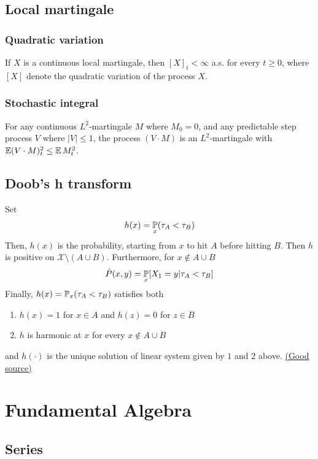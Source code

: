 \documentclass[10pt]{article}
\begin{document}
\subsection{Local martingale}
\subsubsection{Quadratic variation}
 If $X$ is a continuous local martingale, then $[X]_t < \infty$ a.s. for every $t \geq 0$, where $[X]$ denote the quadratic variation of the process $X$.  
\subsubsection{Stochastic integral}
 For any continuous $L^2$-martingale $M$ where $M_0 =0 $, and any predictable step process $V$ where $|V| \leq 1$, the process $(V \cdot M)$ is an $L^2$-martingale with $\mathop{\mathbb{E} \displaystyle} (V \cdot M)_t^2 \leq \mathop{\mathbb{E} \displaystyle} M_t^2$. 
\subsection{Doob's h transform}
Set 
\begin{equation}
    h(x) = \mathop{\mathbb{P} \displaystyle}_x (\tau_A < \tau_B)
\end{equation}
Then, $h(x)$ is the probability, starting from $x$ to hit $A$ before hitting $B$. Then $h$ is positive on $\mathcal{X} \setminus (A \cup B)$. Furthermore, for $x \notin A \cup B$ 
\begin{equation}
    \hat{P}(x,y) = \mathop{\mathbb{P} \displaystyle}_x [X_1 = y | \tau_A < \tau_B]
\end{equation}
Finally, $h(x) =\mathop{\mathbb{P} \displaystyle}_x ( \tau_A < \tau_B)$ satisfies both 
\begin{enumerate}
    \item $h(x) = 1 $ for $x \in A$ and $h(z) =0 $ for $z \in B$
    \item $h$ is harmonic at $x$ for every $x \notin A \cup B$ 
\end{enumerate}
and $h(\cdot)$ is the unique solution of linear system given by $1$ and $2$ above. \href{https://github.com/bellecp/CC-BY-SA-teaching-material/blob/master/stochastic_processes/homework-doob-h-transform-with-python-notebooks.pdf}{(Good source)}
\section{Fundamental Algebra}

\subsection{Series}
\end{document}
